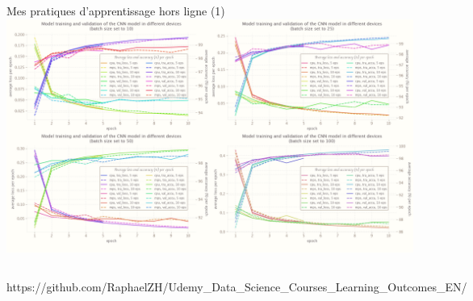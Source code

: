 \documentclass{beamer}
\begin{document}
	\begin{frame}[fragile]{Mes pratiques d'apprentissage hors ligne (1)}
		\centering\includegraphics[width=.76\textwidth]{images/deep_learning_0.png}
		\vspace{-.75em}
		\begin{columns}
			\normalfont\footnotesize{https://github.com/RaphaelZH/Udemy\_Data\_Science\_Courses\_Learning\_Outcomes\_EN/}
		\end{columns}
	\end{frame}
	
\end{document}
